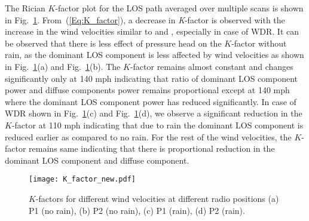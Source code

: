 \documentclass[conference]{IEEEtran}
\begin{document}
  
  
  
 
The Rician $K$-factor plot for the LOS path averaged over multiple scans is shown in Fig.~\ref{Fig:K_factor}. From~(\ref{Eq:K_factor}), a decrease in \textit{K}-factor is observed with the increase in the wind velocities similar to \cite{uwb6} and \cite{Weather_new4}, especially in case of WDR. It can be observed that there is less effect of pressure head on the $K$-factor without rain, as the dominant LOS component is less affected by wind velocities as shown in Fig.~\ref{Fig:K_factor}(a) and Fig.~\ref{Fig:K_factor}(b). The $K$-factor remains almost constant and changes significantly only at 140 mph indicating that ratio of dominant LOS component power and diffuse components power remains proportional except at 140 mph where the dominant LOS component power has reduced significantly. In case of WDR shown in Fig.~\ref{Fig:K_factor}(c) and Fig.~\ref{Fig:K_factor}(d), we observe a significant reduction in the $K$-factor at 110 mph indicating that due to rain the dominant LOS component is reduced earlier as compared to no rain. For the rest of the wind velocities, the $K$-factor remains same indicating that there is proportional reduction in the dominant LOS component and diffuse component. 
\begin{figure}[!t]
	\centering
	\texttt{[image: K\_factor\_new.pdf]}
	\caption{ $K$-factors for different wind velocities at different radio positions (a) P1 (no rain), (b) P2 (no rain), (c) P1 (rain), (d) P2 (rain).
     \vspace{-0.4cm}}\label{Fig:K_factor}
\end{figure}
\end{document}
